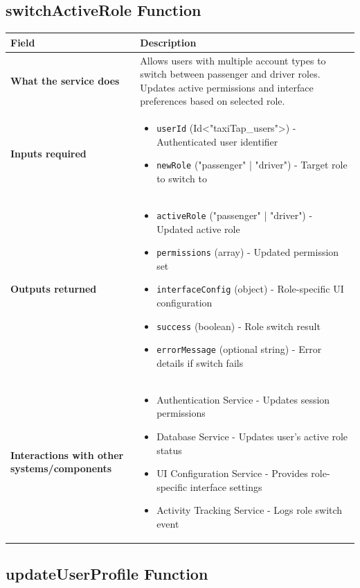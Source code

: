 \documentclass[11pt,a4paper]{article}
\begin{document}
\subsection{switchActiveRole Function}

\begin{longtable}{|p{3cm}|p{12cm}|}
\hline
\textbf{Field} & \textbf{Description} \\
\hline
\textbf{What the service does} & 
Allows users with multiple account types to switch between passenger and driver roles. Updates active permissions and interface preferences based on selected role. \\
\hline
\textbf{Inputs required} & 
\begin{itemize}[nosep]
\item \texttt{userId} (Id<"taxiTap\_users">) - Authenticated user identifier
\item \texttt{newRole} ("passenger" | "driver") - Target role to switch to
\end{itemize} \\
\hline
\textbf{Outputs returned} & 
\begin{itemize}[nosep]
\item \texttt{activeRole} ("passenger" | "driver") - Updated active role
\item \texttt{permissions} (array) - Updated permission set
\item \texttt{interfaceConfig} (object) - Role-specific UI configuration
\item \texttt{success} (boolean) - Role switch result
\item \texttt{errorMessage} (optional string) - Error details if switch fails
\end{itemize} \\
\hline
\textbf{Interactions with other systems/components} & 
\begin{itemize}[nosep]
\item Authentication Service - Updates session permissions
\item Database Service - Updates user's active role status
\item UI Configuration Service - Provides role-specific interface settings
\item Activity Tracking Service - Logs role switch event
\end{itemize} \\
\hline
\end{longtable}

\subsection{updateUserProfile Function}
\end{document}
